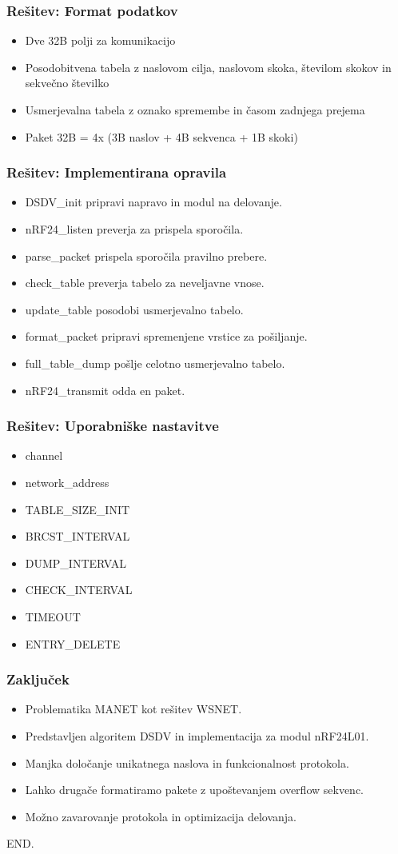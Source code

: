 \documentclass{beamer}
\begin{document}
\begin{frame}
\frametitle{Rešitev: Format podatkov}
\begin{itemize}
\item Dve 32B polji za komunikacijo
\item Posodobitvena tabela z naslovom cilja, naslovom skoka, številom skokov in sekvečno številko
\item Usmerjevalna tabela z oznako spremembe in časom zadnjega prejema
\item Paket 32B = 4x (3B naslov + 4B sekvenca + 1B skoki)
\end{itemize}
\end{frame}

\begin{frame}
\frametitle{Rešitev: Implementirana opravila}
\begin{itemize}
\item DSDV\_init pripravi napravo in modul na delovanje.
\item nRF24\_listen preverja za prispela sporočila.
\item parse\_packet prispela sporočila pravilno prebere.
\item check\_table preverja tabelo za neveljavne vnose.
\item update\_table posodobi usmerjevalno tabelo.
\item format\_packet pripravi spremenjene vrstice za pošiljanje.
\item full\_table\_dump pošlje celotno usmerjevalno tabelo.
\item nRF24\_transmit odda en paket.
\end{itemize}
\end{frame}

\begin{frame}
\frametitle{Rešitev: Uporabniške nastavitve}
\begin{itemize}
\item channel
\item network\_address
\item TABLE\_SIZE\_INIT
\item BRCST\_INTERVAL
\item DUMP\_INTERVAL
\item CHECK\_INTERVAL
\item TIMEOUT
\item ENTRY\_DELETE
\end{itemize}
\end{frame}

\begin{frame}
\frametitle{Zaključek}
\begin{itemize}
\item Problematika MANET kot rešitev WSNET.
\item Predstavljen algoritem DSDV in implementacija za modul nRF24L01.
\item Manjka določanje unikatnega naslova in funkcionalnost protokola.
\item Lahko drugače formatiramo pakete z upoštevanjem overflow sekvenc.
\item Možno zavarovanje protokola in optimizacija delovanja.
\end{itemize}
\end{frame}


\begin{frame}
\Huge{\centerline{END.}}
\end{frame}

\end{document}
